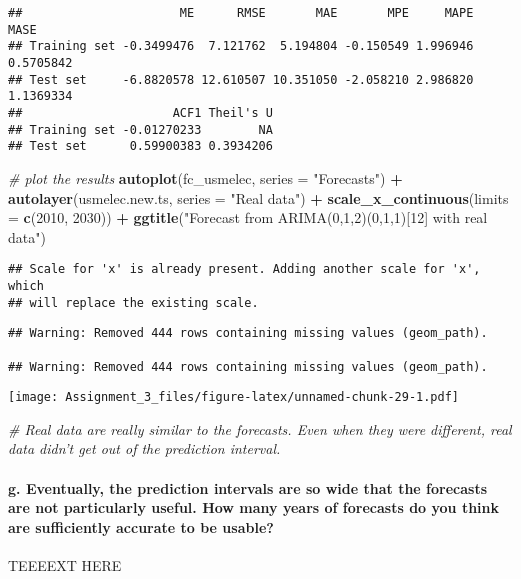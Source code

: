 \documentclass[]{article}
\newenvironment{Shaded}{\begin{snugshade}}{\end{snugshade}}
\newcommand{\KeywordTok}[1]{\textcolor[rgb]{0.13,0.29,0.53}{\textbf{#1}}}
\newcommand{\DataTypeTok}[1]{\textcolor[rgb]{0.13,0.29,0.53}{#1}}
\newcommand{\DecValTok}[1]{\textcolor[rgb]{0.00,0.00,0.81}{#1}}
\newcommand{\StringTok}[1]{\textcolor[rgb]{0.31,0.60,0.02}{#1}}
\newcommand{\CommentTok}[1]{\textcolor[rgb]{0.56,0.35,0.01}{\textit{#1}}}
\newcommand{\OperatorTok}[1]{\textcolor[rgb]{0.81,0.36,0.00}{\textbf{#1}}}
\newcommand{\NormalTok}[1]{#1}
\let\oldparagraph\paragraph
\renewcommand{\paragraph}[1]{\oldparagraph{#1}\mbox{}}
\begin{document}
\begin{verbatim}
##                      ME      RMSE       MAE       MPE     MAPE      MASE
## Training set -0.3499476  7.121762  5.194804 -0.150549 1.996946 0.5705842
## Test set     -6.8820578 12.610507 10.351050 -2.058210 2.986820 1.1369334
##                     ACF1 Theil's U
## Training set -0.01270233        NA
## Test set      0.59900383 0.3934206
\end{verbatim}

\begin{Shaded}
\begin{Highlighting}[]
\CommentTok{# plot the results}
\KeywordTok{autoplot}\NormalTok{(fc_usmelec, }\DataTypeTok{series =} \StringTok{"Forecasts"}\NormalTok{) }\OperatorTok{+}\StringTok{ }\KeywordTok{autolayer}\NormalTok{(usmelec.new.ts, }\DataTypeTok{series =} \StringTok{"Real data"}\NormalTok{) }\OperatorTok{+}\StringTok{ }\KeywordTok{scale_x_continuous}\NormalTok{(}\DataTypeTok{limits =} \KeywordTok{c}\NormalTok{(}\DecValTok{2010}\NormalTok{, }\DecValTok{2030}\NormalTok{)) }\OperatorTok{+}\StringTok{ }\KeywordTok{ggtitle}\NormalTok{(}\StringTok{"Forecast from ARIMA(0,1,2)(0,1,1)[12] with real data"}\NormalTok{)}
\end{Highlighting}
\end{Shaded}

\begin{verbatim}
## Scale for 'x' is already present. Adding another scale for 'x', which
## will replace the existing scale.
\end{verbatim}

\begin{verbatim}
## Warning: Removed 444 rows containing missing values (geom_path).

## Warning: Removed 444 rows containing missing values (geom_path).
\end{verbatim}

\texttt{[image: Assignment\_3\_files/figure-latex/unnamed-chunk-29-1.pdf]}

\begin{Shaded}
\begin{Highlighting}[]
\CommentTok{# Real data are really similar to the forecasts. Even when they were different, real data didn't get out of the prediction interval.}
\end{Highlighting}
\end{Shaded}

\paragraph{g. Eventually, the prediction intervals are so wide that the
forecasts are not particularly useful. How many years of forecasts do
you think are sufficiently accurate to be
usable?}\label{g.-eventually-the-prediction-intervals-are-so-wide-that-the-forecasts-are-not-particularly-useful.-how-many-years-of-forecasts-do-you-think-are-sufficiently-accurate-to-be-usable}

TEEEEXT HERE
\end{document}
